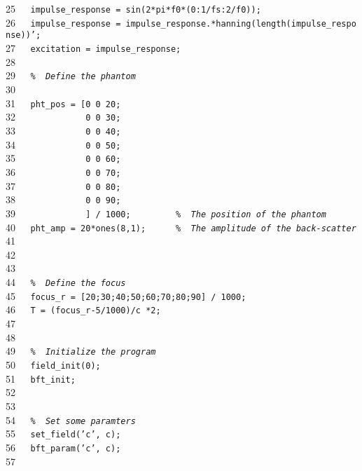 \documentclass{manual}
\begin{document}
{25{\tt~~~}{\tt impulse\_response~=~sin(2*pi*f0*(0:1/fs:2/f0));}\\
26{\tt~~~}{\tt impulse\_response~=~impulse\_response.*hanning(length(impulse\_response))';}\\
27{\tt~~~}{\tt excitation~=~impulse\_response;}\\
28{\tt~~~}{\tt }\\
29{\tt~~~}{\tt {\sl \%~~Define~the~phantom}}\\
30{\tt~~~}{\tt }\\
31{\tt~~~}{\tt pht\_pos~=~[0~0~20;}\\
32{\tt~~~}{\tt ~~~~~~~~~~~0~0~30;}\\
33{\tt~~~}{\tt ~~~~~~~~~~~0~0~40;}\\
34{\tt~~~}{\tt ~~~~~~~~~~~0~0~50;}\\
35{\tt~~~}{\tt ~~~~~~~~~~~0~0~60;}\\
36{\tt~~~}{\tt ~~~~~~~~~~~0~0~70;}\\
37{\tt~~~}{\tt ~~~~~~~~~~~0~0~80;}\\
38{\tt~~~}{\tt ~~~~~~~~~~~0~0~90;}\\
39{\tt~~~}{\tt ~~~~~~~~~~~]~/~1000;~~~~~~~~~{\sl \%~~The~position~of~the~phantom}}\\
40{\tt~~~}{\tt pht\_amp~=~20*ones(8,1);~~~~~~{\sl \%~~The~amplitude~of~the~back-scatter}}\\
41{\tt~~~}{\tt }\\
42{\tt~~~}{\tt }\\
43{\tt~~~}{\tt }\\
44{\tt~~~}{\tt {\sl \%~~Define~the~focus~}}\\
45{\tt~~~}{\tt focus\_r~=~[20;30;40;50;60;70;80;90]~/~1000;}\\
46{\tt~~~}{\tt T~=~(focus\_r-5/1000)/c~*2;}\\
47{\tt~~~}{\tt }\\
48{\tt~~~}{\tt }\\
49{\tt~~~}{\tt {\sl \%~~Initialize~the~program}}\\
50{\tt~~~}{\tt field\_init(0);}\\
51{\tt~~~}{\tt bft\_init;}\\
52{\tt~~~}{\tt }\\
53{\tt~~~}{\tt }\\
54{\tt~~~}{\tt {\sl \%~~Set~some~paramters}}\\
55{\tt~~~}{\tt set\_field('c',~c);}\\
56{\tt~~~}{\tt bft\_param('c',~c);}\\
57{\tt~~~}{\tt }\\
}
\end{document}
